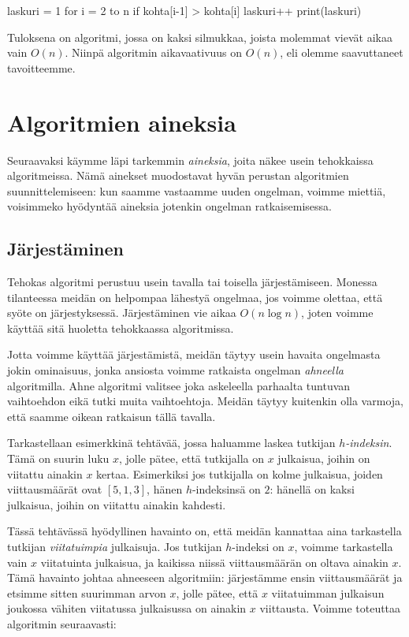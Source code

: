 \begin{code}
laskuri = 1
for i = 2 to n
    if kohta[i-1] > kohta[i]
        laskuri++
print(laskuri)
\end{code}

Tuloksena on algoritmi, jossa on kaksi silmukkaa,
joista molemmat vievät aikaa vain $O(n)$.
Niinpä algoritmin aikavaativuus on $O(n)$,
eli olemme saavuttaneet tavoitteemme.

\section{Algoritmien aineksia}

Seuraavaksi käymme läpi tarkemmin \emph{aineksia},
joita näkee usein tehokkaissa algoritmeissa.
Nämä ainekset muodostavat hyvän perustan algoritmien
suunnittelemiseen: kun saamme vastaamme uuden ongelman,
voimme miettiä, voisimmeko hyödyntää aineksia jotenkin
ongelman ratkaisemisessa.

\subsection{Järjestäminen}

Tehokas algoritmi perustuu usein tavalla tai toisella järjestämiseen.
Monessa tilanteessa meidän on helpompaa lähestyä ongelmaa,
jos voimme olettaa, että syöte on järjestyksessä.
Järjestäminen vie aikaa $O(n \log n)$, joten voimme käyttää sitä
huoletta tehokkaassa algoritmissa.

Jotta voimme käyttää järjestämistä, meidän täytyy usein havaita
ongelmasta jokin ominaisuus, jonka ansiosta voimme ratkaista
ongelman \emph{ahneella} algoritmilla.
Ahne algoritmi valitsee joka askeleella parhaalta tuntuvan
vaihtoehdon eikä tutki muita vaihtoehtoja.
Meidän täytyy kuitenkin olla varmoja, että saamme oikean ratkaisun tällä tavalla.

Tarkastellaan esimerkkinä tehtävää, jossa haluamme laskea
tutkijan \emph{$h$-indeksin}. Tämä on suurin luku $x$, jolle pätee,
että tutkijalla on $x$ julkaisua, joihin on viitattu ainakin $x$ kertaa.
Esimerkiksi jos tutkijalla on kolme julkaisua,
joiden viittausmäärät ovat $[5,1,3]$, hänen $h$-indeksinsä on $2$:
hänellä on kaksi julkaisua, joihin on viitattu ainakin kahdesti.

Tässä tehtävässä hyödyllinen havainto on, että meidän kannattaa aina
tarkastella tutkijan \emph{viitatuimpia} julkaisuja.
Jos tutkijan $h$-indeksi on $x$, voimme tarkastella vain $x$ viitatuinta
julkaisua, ja kaikissa niissä viittausmäärän on oltava ainakin $x$.
Tämä havainto johtaa ahneeseen algoritmiin: järjestämme ensin
viittausmäärät ja etsimme sitten suurimman arvon $x$,
jolle pätee, että $x$ viitatuimman julkaisun joukossa vähiten viitatussa
julkaisussa on ainakin $x$ viittausta. Voimme toteuttaa algoritmin seuraavasti:

